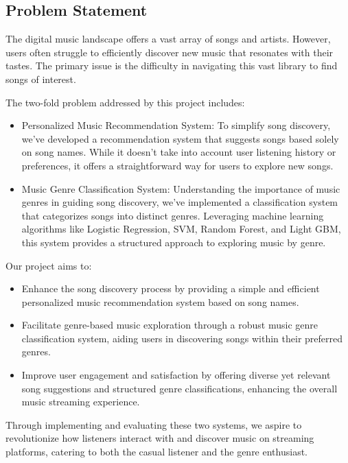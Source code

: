 \documentclass[a4paper, 24pt]{article}
\begin{document}
\subsection{Problem Statement}

The digital music landscape offers a vast array of songs and artists. However, users often struggle to efficiently discover new music that resonates with their tastes. The primary issue is the difficulty in navigating this vast library to find songs of interest.

The two-fold problem addressed by this project includes:

\begin{itemize}
\item Personalized Music Recommendation System: To simplify song discovery, we've developed a recommendation system that suggests songs based solely on song names. While it doesn't take into account user listening history or preferences, it offers a straightforward way for users to explore new songs.
\item Music Genre Classification System: Understanding the importance of music genres in guiding song discovery, we've implemented a classification system that categorizes songs into distinct genres. Leveraging machine learning algorithms like Logistic Regression, SVM, Random Forest, and Light GBM, this system provides a structured approach to exploring music by genre.
\end{itemize}

Our project aims to:

\begin{itemize}
\item Enhance the song discovery process by providing a simple and efficient personalized music recommendation system based on song names.
\item Facilitate genre-based music exploration through a robust music genre classification system, aiding users in discovering songs within their preferred genres.
\item Improve user engagement and satisfaction by offering diverse yet relevant song suggestions and structured genre classifications, enhancing the overall music streaming experience.
\end{itemize}

Through implementing and evaluating these two systems, we aspire to revolutionize how listeners interact with and discover music on streaming platforms, catering to both the casual listener and the genre enthusiast.
\end{document}
